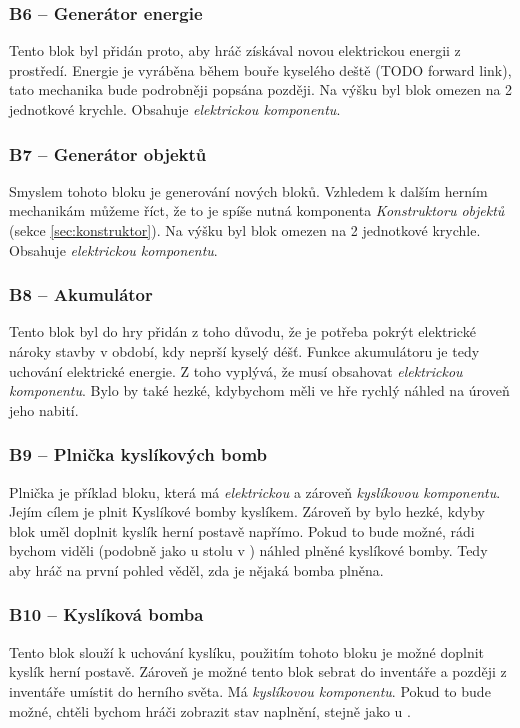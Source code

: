 \subsubsection{B6 -- Generátor energie}
\label{blocks:B6}
Tento blok byl přidán proto, aby hráč získával novou elektrickou energii z prostředí. Energie je vyráběna během bouře kyselého deště (TODO forward link), tato mechanika bude podrobněji popsána později. Na výšku byl blok omezen na 2 jednotkové krychle. Obsahuje \textit{elektrickou komponentu}. 


\subsubsection{B7 -- Generátor objektů}
\label{blocks:B7}
Smyslem tohoto bloku je generování nových bloků. Vzhledem k dalším herním mechanikám můžeme říct, že to je spíše nutná komponenta \textit{Konstruktoru objektů} (sekce \ref{sec:konstruktor}). Na výšku byl blok omezen na 2 jednotkové krychle. Obsahuje \textit{elektrickou komponentu}.


\subsubsection{B8 -- Akumulátor}
\label{blocks:B8}
Tento blok byl do hry přidán z toho důvodu, že je potřeba pokrýt elektrické nároky stavby v období, kdy neprší kyselý déšť. Funkce akumulátoru je tedy uchování elektrické energie. Z toho vyplývá, že musí obsahovat \textit{elektrickou komponentu}. Bylo by také hezké, kdybychom měli ve hře rychlý náhled na úroveň jeho nabití.


\subsubsection{B9 -- Plnička kyslíkových bomb}
\label{blocks:B9}
Plnička je příklad bloku, která má \textit{elektrickou} a zároveň \textit{kyslíkovou komponentu}. Jejím cílem je plnit Kyslíkové bomby kyslíkem. Zároveň by bylo hezké, kdyby blok uměl doplnit kyslík herní postavě napřímo. Pokud to bude možné, rádi bychom viděli (podobně jako u stolu v \ME{}) náhled plněné kyslíkové bomby. Tedy aby hráč na první pohled věděl, zda je nějaká bomba plněna.

\subsubsection{B10 -- Kyslíková bomba}
\label{blocks:B10}
Tento blok slouží k uchování kyslíku, použitím tohoto bloku je možné doplnit kyslík herní postavě. Zároveň je možné tento blok sebrat do inventáře a později z inventáře umístit do herního světa. Má \textit{kyslíkovou komponentu}. Pokud to bude možné, chtěli bychom hráči zobrazit stav naplnění, stejně jako u .


